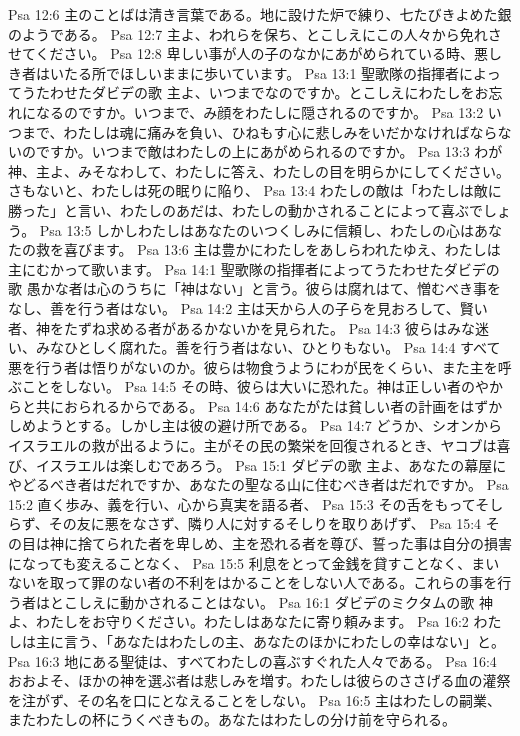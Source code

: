 Psa 12:6  主のことばは清き言葉である。地に設けた炉で練り、七たびきよめた銀のようである。
Psa 12:7  主よ、われらを保ち、とこしえにこの人々から免れさせてください。
Psa 12:8  卑しい事が人の子のなかにあがめられている時、悪しき者はいたる所でほしいままに歩いています。
Psa 13:1  聖歌隊の指揮者によってうたわせたダビデの歌 主よ、いつまでなのですか。とこしえにわたしをお忘れになるのですか。いつまで、み顔をわたしに隠されるのですか。
Psa 13:2  いつまで、わたしは魂に痛みを負い、ひねもす心に悲しみをいだかなければならないのですか。いつまで敵はわたしの上にあがめられるのですか。
Psa 13:3  わが神、主よ、みそなわして、わたしに答え、わたしの目を明らかにしてください。さもないと、わたしは死の眠りに陥り、
Psa 13:4  わたしの敵は「わたしは敵に勝った」と言い、わたしのあだは、わたしの動かされることによって喜ぶでしょう。
Psa 13:5  しかしわたしはあなたのいつくしみに信頼し、わたしの心はあなたの救を喜びます。
Psa 13:6  主は豊かにわたしをあしらわれたゆえ、わたしは主にむかって歌います。
Psa 14:1  聖歌隊の指揮者によってうたわせたダビデの歌 愚かな者は心のうちに「神はない」と言う。彼らは腐れはて、憎むべき事をなし、善を行う者はない。
Psa 14:2  主は天から人の子らを見おろして、賢い者、神をたずね求める者があるかないかを見られた。
Psa 14:3  彼らはみな迷い、みなひとしく腐れた。善を行う者はない、ひとりもない。
Psa 14:4  すべて悪を行う者は悟りがないのか。彼らは物食うようにわが民をくらい、また主を呼ぶことをしない。
Psa 14:5  その時、彼らは大いに恐れた。神は正しい者のやからと共におられるからである。
Psa 14:6  あなたがたは貧しい者の計画をはずかしめようとする。しかし主は彼の避け所である。
Psa 14:7  どうか、シオンからイスラエルの救が出るように。主がその民の繁栄を回復されるとき、ヤコブは喜び、イスラエルは楽しむであろう。
Psa 15:1  ダビデの歌 主よ、あなたの幕屋にやどるべき者はだれですか、あなたの聖なる山に住むべき者はだれですか。
Psa 15:2  直く歩み、義を行い、心から真実を語る者、
Psa 15:3  その舌をもってそしらず、その友に悪をなさず、隣り人に対するそしりを取りあげず、
Psa 15:4  その目は神に捨てられた者を卑しめ、主を恐れる者を尊び、誓った事は自分の損害になっても変えることなく、
Psa 15:5  利息をとって金銭を貸すことなく、まいないを取って罪のない者の不利をはかることをしない人である。これらの事を行う者はとこしえに動かされることはない。
Psa 16:1  ダビデのミクタムの歌 神よ、わたしをお守りください。わたしはあなたに寄り頼みます。
Psa 16:2  わたしは主に言う、「あなたはわたしの主、あなたのほかにわたしの幸はない」と。
Psa 16:3  地にある聖徒は、すべてわたしの喜ぶすぐれた人々である。
Psa 16:4  おおよそ、ほかの神を選ぶ者は悲しみを増す。わたしは彼らのささげる血の灌祭を注がず、その名を口にとなえることをしない。
Psa 16:5  主はわたしの嗣業、またわたしの杯にうくべきもの。あなたはわたしの分け前を守られる。
